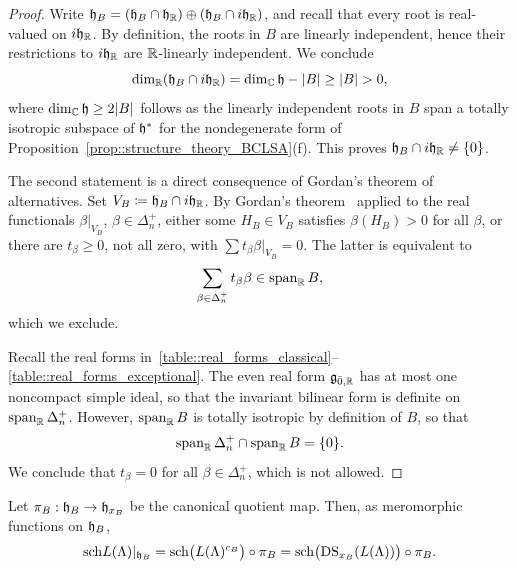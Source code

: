 \begin{proof} Write ${\mathfrak h}_B=({\mathfrak h}_B\cap{\mathfrak h}_{{\mathbb R}})\oplus({\mathfrak h}_B\cap i{\mathfrak h}_{{\mathbb R}})$, and recall that every root is real-valued on $i{\mathfrak h}_{{\mathbb R}}$. By definition, the roots in $B$ are linearly independent, hence their restrictions to $i{\mathfrak h}_{{\mathbb R}}$ are ${\mathbb R}$-linearly independent. We conclude \[\dim_{\RR}(\hh_B\cap i\hh_{\RR})=\dim_{\CC}\hh-|B|\geq|B|>0,\] where $\dim_{{\mathbb C}}{\mathfrak h}\geq2|B|$ follows as the linearly independent roots in $B$ span a totally isotropic subspace of ${\mathfrak h}^{\ast}$ for the nondegenerate form of Proposition~\ref{prop::structure_theory_BCLSA}(f). This proves ${\mathfrak h}_{B}\cap i{\mathfrak h}_{{\mathbb R}}\neq \{0\}$.

The second statement is a direct consequence of Gordan's theorem of alternatives. Set $V_B\coloneqq{\mathfrak h}_B\cap i{\mathfrak h}_{{\mathbb R}}$. By Gordan's theorem~\cite{Gordan} applied to the real functionals $\beta|_{V_B}$, $\beta\in\Delta_n^+$, either some $H_B\in V_B$ satisfies $\beta(H_B)>0$ for all $\beta$, or there are $t_\beta\geq0$, not all zero, with $\sum t_\beta\beta\big\vert_{V_B}=0$. The latter is equivalent to \[\sum_{\beta \in \Delta_{n}^{+}} t_\beta\beta\in\operatorname{span}_{{\mathbb R}}B,\]
which we exclude. 

Recall the real forms in~\eqref{table::real_forms_classical}--\eqref{table::real_forms_exceptional}. The even real form ${\mathfrak{g}}_{\bar0,{\mathbb R}}$ has at most one noncompact simple ideal, so that the invariant bilinear form is definite on $\operatorname{span}_{{\mathbb R}}\Delta_n^+$. However, $\operatorname{span}_{{\mathbb R}}B$ is totally isotropic by definition of $B$, so that 
\[
\operatorname{span}_{{\mathbb R}}\Delta_n^+
\cap\operatorname{span}_{{\mathbb R}}B
=
\{0\}.
\]
We conclude that $t_{\beta}=0$ for all $\beta \in \Delta_{n}^{+}$, which is not allowed. 
\end{proof}


\begin{lemma}
\label{lemm::restricted_character_with_kernel}
Let $\pi_B:{\mathfrak h}_B\to{\mathfrak h}_{x_B}$ be the canonical quotient map. Then, as meromorphic functions on ${\mathfrak h}_B$,
\[
{\operatorname{sch}} L(\Lambda)|_{{\mathfrak h}_B}
=
{\operatorname{sch}}\bigl(L(\Lambda)^{c_B}\bigr)\circ\pi_B
=
{\operatorname{sch}}\bigl(\operatorname{DS}_{x_B}(L(\Lambda))\bigr)\circ\pi_B.
\]
\end{lemma}


